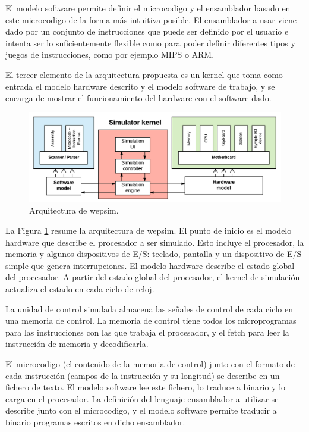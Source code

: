 El modelo \gls{software} permite definir el \gls{microcodigo} y el \gls{ensamblador} basado en este \gls{microcodigo} de la forma más intuitiva posible. El \gls{ensamblador} a usar viene dado por un conjunto de instrucciones que puede ser definido por el usuario e intenta ser lo suficientemente flexible como para poder definir diferentes tipos y juegos de instrucciones, como por ejemplo MIPS o ARM.

El tercer elemento de la arquitectura propuesta es un kernel que toma como entrada el modelo \gls{hardware} descrito y el modelo \gls{software} de trabajo, y se encarga de mostrar el funcionamiento del \gls{hardware} con el \gls{software} dado.

\begin{figure}[htbp]
 	\centering
 	\includegraphics[width=14cm]{figures/architecture_diagram}
 	\caption{Arquitectura de \acrshort{wepsim}.}
	\label{fig:architecture_diagram}
\end{figure}

La Figura \ref{fig:architecture_diagram} resume la arquitectura de \acrshort{wepsim}. El punto de inicio es el modelo \gls{hardware} que describe el procesador a ser simulado. Esto incluye el procesador, la memoria y algunos dispositivos de E/S: teclado, pantalla y un dispositivo de E/S simple que genera interrupciones. El modelo \gls{hardware} describe el estado global del procesador. A partir del estado global del procesador, el kernel de simulación actualiza el estado en cada ciclo de reloj.

La unidad de control simulada almacena las señales de control de cada ciclo en una memoria de control. La memoria de control tiene todos los microprogramas para las instrucciones con las que trabaja el procesador, y el fetch para leer la instrucción de memoria y decodificarla.


El \gls{microcodigo} (el contenido de la memoria de control) junto con el formato de cada instrucción (campos de la instrucción y su longitud) se describe en un fichero de texto. El modelo \gls{software} lee este fichero, lo traduce a binario y lo carga en el procesador. La definición del lenguaje \gls{ensamblador} a utilizar se describe junto con el \gls{microcodigo}, y el modelo \gls{software} permite traducir a binario programas escritos en dicho \gls{ensamblador}.


